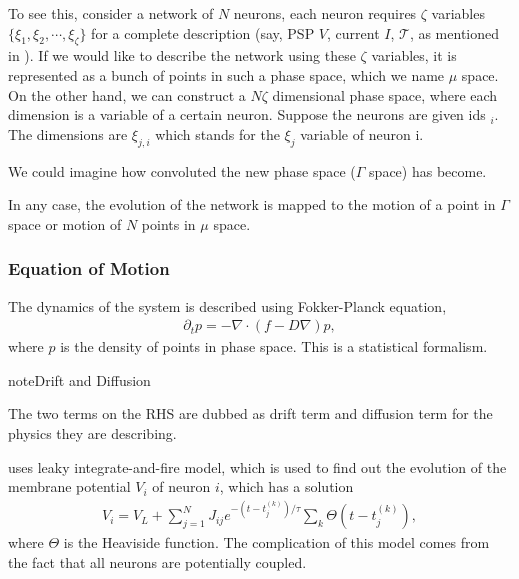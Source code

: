 \documentclass[letterpaper,10pt,english]{sphinxmanual}
\begin{document}
To see this, consider a network of \(N\) neurons, each neuron requires \(\zeta\) variables \(\{ \xi_1, \xi_2,\cdots, \xi_\zeta\}\) for a complete description (say, PSP \(V\), current \(I\), \(\mathcal T\), as mentioned in \label{\detokenize{topics/mean-field:id2}}{\hyperref[\detokenize{topics/mean-field:deco2008}]{\sphinxcrossref{{[}Deco2008{]}}}}). If we would like to describe the network using these \(\zeta\) variables, it is represented as a bunch of points in such a phase space, which we name \(\mu\) space. On the other hand, we can construct a \(N\zeta\) dimensional phase space, where each dimension is a variable of a certain neuron. Suppose the neurons are given ids \({}_i\). The dimensions are \(\xi_{j,i}\) which stands for the \(\xi_j\) variable of neuron i.

We could imagine how convoluted the new phase space (\(\Gamma\) space) has become.

In any case, the evolution of the network is mapped to the motion of a point in \(\Gamma\) space or motion of \(N\) points in \(\mu\) space.


\subsubsection{Equation of Motion}
\label{\detokenize{topics/mean-field:equation-of-motion}}
The dynamics of the system is described using Fokker-Planck equation,
\begin{equation*}
\begin{split}\partial_t p = - \nabla\cdot (f-D \nabla) p,\end{split}
\end{equation*}
where \(p\) is the density of points in phase space. This is a statistical formalism.

\begin{sphinxadmonition}{note}{Drift and Diffusion}

The two terms on the RHS are dubbed as drift term and diffusion term for the physics they are describing.
\end{sphinxadmonition}

\label{\detokenize{topics/mean-field:id3}}{\hyperref[\detokenize{topics/mean-field:deco2008}]{\sphinxcrossref{{[}Deco2008{]}}}} uses leaky integrate-and-fire model, which is used to find out the evolution of the membrane potential \(V_i\) of neuron \(i\), which has a solution
\begin{equation*}
\begin{split}V_i = V_L + \sum_{j=1}^N J_{ij} e^{-(t-t_j^{(k)})/\tau} \sum_k \Theta(t-t_j^{(k)}),\end{split}
\end{equation*}
where \(\Theta\) is the Heaviside function. The complication of this model comes from the fact that all neurons are potentially coupled.
\end{document}
